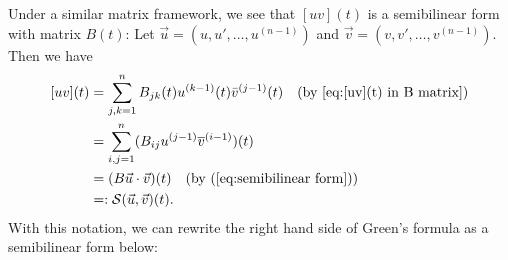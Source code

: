 \documentclass[11pt, oneside, a4paper]{article}
\begin{document}
Under a similar matrix framework, we see that $[uv](t)$ is a semibilinear form with matrix $B(t)$: Let $\vec{u}=(u, u', \ldots, u^{(n-1)})$ and $\vec{v}=(v, v', \ldots, v^{(n-1)})$. Then we have
\begin{equation}\label{[uv](t) in semibilinear form}
    \begin{split}
    [uv](t) &= \sum_{j,k=1}^n B_{jk}(t)u^{(k-1)}(t)\bar{v}^{(j-1)}(t)\quad\mbox{(by \eqref{eq:[uv](t) in B matrix})}\\
    &= \sum_{i,j=1}^n (B_{ij}u^{(j-1)}\overline{v}^{(i-1)})(t)\\
    &= (B\vec{u}\cdot \vec{v})(t)\quad\mbox{(by (\ref{eq:semibilinear form}))}\\
    &=: \mathcal{S}(\vec{u},\vec{v})(t).
    \end{split}
\end{equation}
With this notation, we can rewrite the right hand side of Green's formula as a semibilinear form below:
\end{document}
